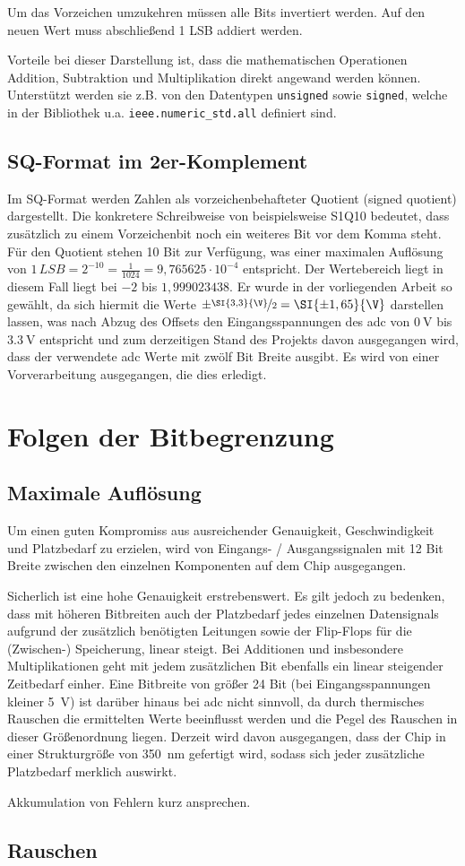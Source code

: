 Um das Vorzeichen umzukehren müssen alle Bits invertiert werden. Auf den neuen Wert muss abschließend 1 LSB addiert werden.

Vorteile bei dieser Darstellung ist, dass die mathematischen Operationen Addition, Subtraktion und Multiplikation direkt angewand werden können. Unterstützt werden sie z.B. 
von den Datentypen \texttt{unsigned} sowie \texttt{signed}, welche in der Bibliothek u.a. \texttt{ieee.numeric\_std.all} definiert sind.




\subsection{SQ-Format im 2er-Komplement}

Im SQ-Format werden Zahlen als vorzeichenbehafteter Quotient (signed quotient) dargestellt. Die konkretere Schreibweise von beispielsweise S1Q10 bedeutet, dass zusätzlich zu
einem Vorzeichenbit noch ein weiteres Bit vor dem Komma steht. Für den Quotient stehen 10 Bit zur Verfügung, was einer maximalen Auflösung  von 
$1\,LSB = 2^{-10} = \frac{1}{1024} = 9,765625\cdot10^{-4}$ entspricht. Der Wertebereich liegt in diesem Fall liegt bei $-2$ bis $1,999023438$. Er wurde in der vorliegenden 
Arbeit so gewählt, da sich hiermit die Werte $\pm\nicefrac{\SI{3,3}{\V}}{2} = \SI{\pm1,65}{\V}$ darstellen lassen, was nach Abzug des Offsets den Eingangsspannungen des \gls{adc}
von $\SI{0}{\V}$ bis $\SI{3,3}{\V}$ entspricht und zum derzeitigen Stand des Projekts davon ausgegangen wird, dass der verwendete \gls{adc} Werte mit zwölf Bit Breite ausgibt. 
Es wird von einer Vorverarbeitung ausgegangen, die dies erledigt.




\section{Folgen der Bitbegrenzung}
\subsection{Maximale Auflösung}

Um einen guten Kompromiss aus ausreichender Genauigkeit, Geschwindigkeit und Platzbedarf zu erzielen, wird von Eingangs- / Ausgangssignalen mit 12 Bit Breite zwischen
den einzelnen Komponenten auf dem Chip ausgegangen.

Sicherlich ist eine hohe Genauigkeit erstrebenswert. Es gilt jedoch zu bedenken, dass mit höheren Bitbreiten auch der Platzbedarf jedes einzelnen Datensignals aufgrund der 
zusätzlich benötigten Leitungen sowie der Flip-Flops für die (Zwischen-) Speicherung, linear steigt. 
Bei Additionen und insbesondere Multiplikationen geht mit jedem zusätzlichen Bit ebenfalls ein linear steigender Zeitbedarf einher.
Eine Bitbreite von größer 24 Bit (bei Eingangsspannungen kleiner \SI{5}{V}) ist darüber hinaus bei \gls{adc} nicht sinnvoll, da durch thermisches Rauschen die ermittelten 
Werte beeinflusst werden und die Pegel des Rauschen in dieser Größenordnung liegen.
Derzeit wird davon ausgegangen, dass der Chip in einer Strukturgröße von \SI{350}{nm} gefertigt wird, sodass sich jeder zusätzliche Platzbedarf merklich auswirkt.

Akkumulation von Fehlern kurz ansprechen.
 
\subsection{Rauschen}

